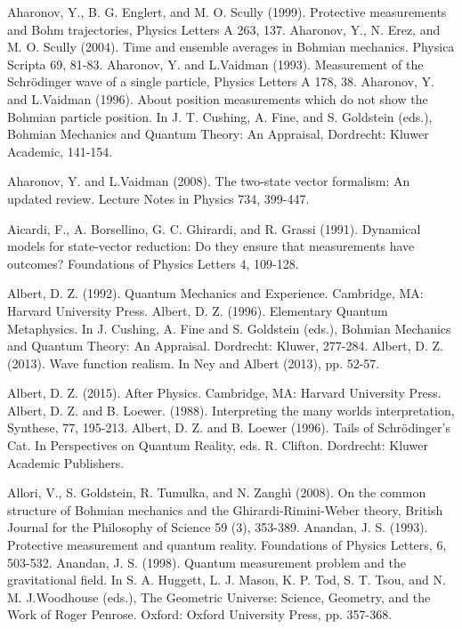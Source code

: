 \begin{thebibliography}{}
\bibitem{} Aharonov, Y., B. G. Englert, and M. O. Scully  (1999). Protective measurements and Bohm trajectories, Physics Letters A 263, 137.
\bibitem{} Aharonov, Y., N. Erez, and  M. O. Scully (2004). Time and ensemble averages in Bohmian mechanics. Physica Scripta 69, 81-83.
\bibitem{} Aharonov, Y. and L.Vaidman (1993). Measurement of the Schr\"{o}dinger wave of a single particle, Physics Letters A 178, 38.
\bibitem{} Aharonov, Y. and L.Vaidman (1996). About position measurements which do not show the Bohmian particle position. In J. T. Cushing, A. Fine, and S. Goldstein (eds.), Bohmian Mechanics and Quantum Theory: An Appraisal, Dordrecht: Kluwer Academic, 141-154. 

\bibitem{} Aharonov, Y. and L.Vaidman (2008). The two-state vector formalism: An updated review. Lecture Notes in Physics 734, 399-447.


\bibitem{} Aicardi, F., A. Borsellino, G. C. Ghirardi, and R. Grassi (1991). Dynamical models for state-vector
reduction: Do they ensure that measurements have outcomes? Foundations of Physics Letters 4, 109-128.

\bibitem{} Albert, D. Z. (1992). Quantum Mechanics and Experience. Cambridge, MA: Harvard University Press.
\bibitem{} Albert, D. Z. (1996). Elementary Quantum Metaphysics. In J. Cushing, A. Fine and S. Goldstein (eds.), Bohmian Mechanics and Quantum Theory: An Appraisal. Dordrecht: Kluwer, 277-284.
\bibitem{} Albert, D. Z. (2013). Wave function realism. In Ney and Albert (2013), pp. 52-57.

\bibitem{} Albert, D. Z. (2015). After Physics. Cambridge, MA: Harvard University Press.
\bibitem{} Albert, D. Z. and B. Loewer. (1988). Interpreting the many worlds interpretation, Synthese, 77, 195-213.
\bibitem{} Albert, D. Z. and B. Loewer (1996). Tails of Schr\"{o}dinger's Cat. In Perspectives on Quantum Reality, eds. R. Clifton. Dordrecht: Kluwer Academic Publishers.

\bibitem{} Allori, V., S. Goldstein, R. Tumulka, and N. Zangh\`{i} (2008). On the common structure of Bohmian mechanics and the Ghirardi-Rimini-Weber theory, British Journal for the Philosophy of Science 59 (3), 353-389.
\bibitem{} Anandan,	J. S. (1993). Protective measurement and quantum reality. Foundations of Physics Letters, 6, 503-532.
\bibitem{} Anandan, J. S. (1998). Quantum measurement problem and the gravitational field. In S. A. Huggett, L. J. Mason, K. P. Tod, S. T. Tsou, and N. M. J.Woodhouse (eds.), The Geometric Universe: Science, Geometry, and the Work of Roger Penrose. Oxford: Oxford University Press, pp. 357-368.


\end{thebibliography}
